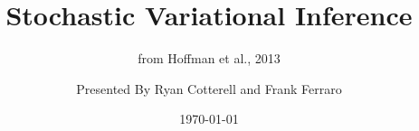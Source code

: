 \documentclass{beamer}
\begin{document}
\title{Stochastic Variational Inference}   
\subtitle{from Hoffman et al., 2013}
\author{Presented By Ryan Cotterell and Frank Ferraro} 
\date{\today} 

\frame{\titlepage} 














 








\end{document}
